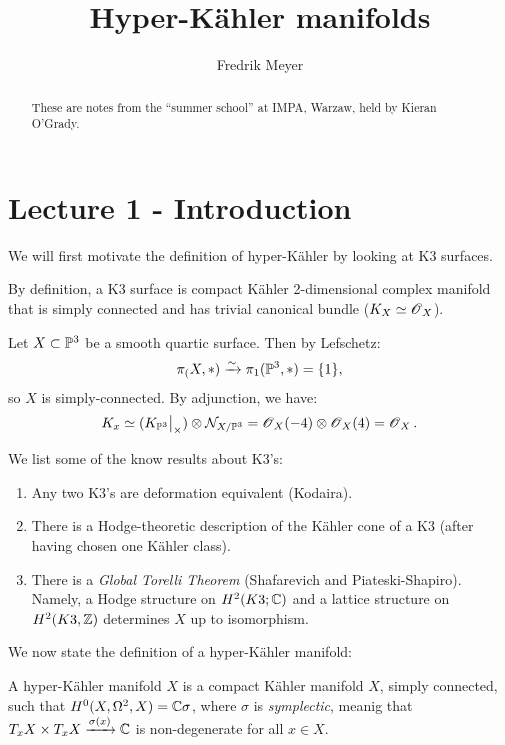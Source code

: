 \documentclass[11pt, english]{article}
\begin{document}
\title{Hyper-Kähler manifolds}
\author{Fredrik Meyer}
\maketitle 

\begin{abstract}
These are notes from the ``summer school'' at IMPA, Warzaw, held by Kieran O'Grady.
\end{abstract}

\section{Lecture 1 - Introduction}

We will first motivate the definition of hyper-Kähler by looking at K3 surfaces. 

By definition, a K3 surface is compact Kähler 2-dimensional complex manifold that is simply connected and has trivial canonical bundle ($K_X \simeq \operatorname{\mathscr{O}}_X$).

\begin{example}
Let $X \subset \mathbb{P}^3$ be a smooth quartic surface. Then by Lefschetz:
$$
\pi_(X,\ast) \xrightarrow{\sim} \pi_1(\mathbb{P}^3,\ast) = \{1\},
$$
so $X$ is simply-connected. By adjunction, we have:
$$
K_x \simeq (\restr{K_{\PP^3}}{\X}) \otimes \mathcal N_{X/\PP^3} = \OO_X(-4) \otimes \OO_X(4) = \OO_X.
$$
\end{example}

We list some of the know results about K3's:

\begin{enumerate}
\item Any two K3's are deformation equivalent (Kodaira).
\item There is a Hodge-theoretic description of the Kähler cone of a K3 (after having chosen one Kähler class).
\item There is a \emph{Global Torelli Theorem} (Shafarevich and Piateski-Shapiro). Namely, a Hodge structure on $H^2(K3; \mathbb{C})$ and a lattice structure on $H^2(K3,\mathbb{Z})$ determines $X$ up to isomorphism.
\end{enumerate}

We now state the definition of a hyper-Kähler manifold:

A hyper-Kähler manifold $X$ is a compact Kähler manifold $X$, simply connected, such that $H^0(X,\Omega^2,X) = \mathbb{C} \sigma$, where $\sigma$ is \emph{symplectic}, meanig that $T_xX \times T_xX \xrightarrow{\sigma(x)} \mathbb{C}$ is non-degenerate for all $x \in X$.
\end{document}
